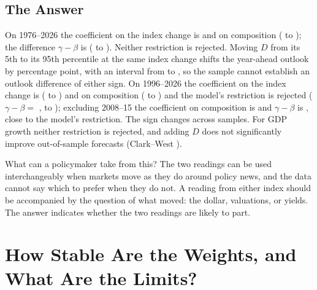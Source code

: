 \documentclass[11pt]{article}
\begin{document}
\subsection{The Answer}\label{sec:answer}
On 1976--2026 the coefficient on the index change is  and on composition  ( to ); the difference $\gamma-\beta$ is  ( to ). Neither restriction is rejected. Moving $D$ from its 5th to its 95th percentile at the same index change shifts the year-ahead outlook by  percentage point, with an interval from  to , so the sample cannot establish an outlook difference of either sign. On 1996--2026 the coefficient on the index change is  ( to ) and on composition  ( to ) and the model's restriction is rejected ($\gamma-\beta=$ ,  to ); excluding 2008--15 the coefficient on composition is  and $\gamma-\beta$ is , close to the model's restriction. The sign changes across samples. For GDP growth neither restriction is rejected, and adding $D$ does not significantly improve out-of-sample forecasts (Clark--West ).



What can a policymaker take from this? The two readings can be used interchangeably when markets move as they do around policy news, and the data cannot say which to prefer when they do not. A reading from either index should be accompanied by the question of what moved: the dollar, valuations, or yields. The answer indicates whether the two readings are likely to part.


\FloatBarrier

\section{How Stable Are the Weights, and What Are the Limits?}\label{sec:limitsmain}
\end{document}
